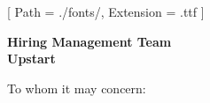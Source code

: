 


\renewcommand{\photo}[2]{}

\geometry{
  left=2cm,
  right=2cm,
  top=2cm,
  bottom=2cm
}



\makecvheader

\setmainfont{NotoSans-Regular}[
  Path = ./fonts/,
  Extension = .ttf
]

\vspace{1cm}
\indent\textbf{Hiring Management Team}\\
\indent\textbf{Upstart}

\vspace{0.5cm}

\noindent To whom it may concern:

\vspace{0.5cm}

